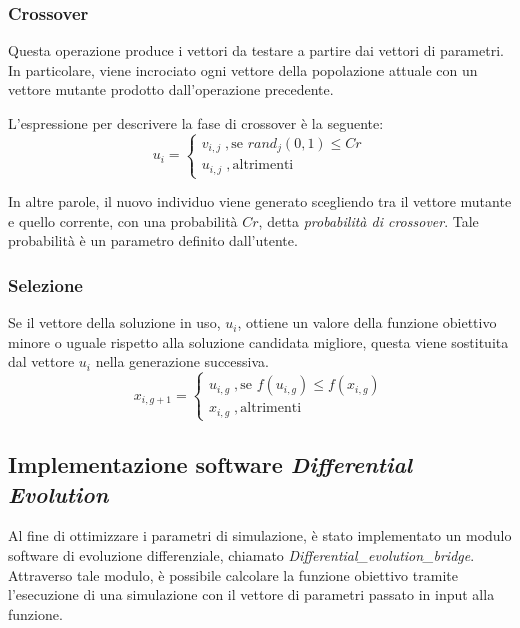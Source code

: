 \subsubsection{Crossover}

Questa operazione produce i vettori da testare a partire dai vettori di parametri.
In particolare, viene incrociato ogni vettore della popolazione attuale con un vettore mutante prodotto dall'operazione precedente.

L'espressione per descrivere la fase di crossover è la seguente:
\begin{equation*}
    u_{i} = \begin{cases}
        v_{i,j} \; , \text{se } rand_{j}(0,1) \leq Cr \\
        u_{i,j} \; , \text{altrimenti} 
    \end{cases}
\end{equation*}

In altre parole, il nuovo individuo viene generato scegliendo tra il vettore mutante e quello corrente, con una probabilità $Cr$, detta \textit{probabilità di crossover}.
Tale probabilità è un parametro definito dall'utente.

\subsubsection{Selezione}

Se il vettore della soluzione in uso, $u_{i}$, ottiene un valore della funzione obiettivo minore o uguale rispetto alla soluzione candidata migliore, questa viene sostituita dal vettore $u_{i}$ nella generazione successiva.
\begin{equation*}
    x_{i,g+1} = \begin{cases}
        u_{i,g} \; , \text{se } f(u_{i,g}) \leq f(x_{i,g}) \\
        x_{i,g} \; , \text{altrimenti} 
    \end{cases}
\end{equation*}

\subsection{Implementazione software \textit{Differential Evolution}}

Al fine di ottimizzare i parametri di simulazione, è stato implementato un modulo software di evoluzione differenziale, chiamato \textit{Differential\_evolution\_bridge}.
Attraverso tale modulo, è possibile calcolare la funzione obiettivo tramite l'esecuzione di una simulazione con il vettore di parametri passato in input alla funzione.

